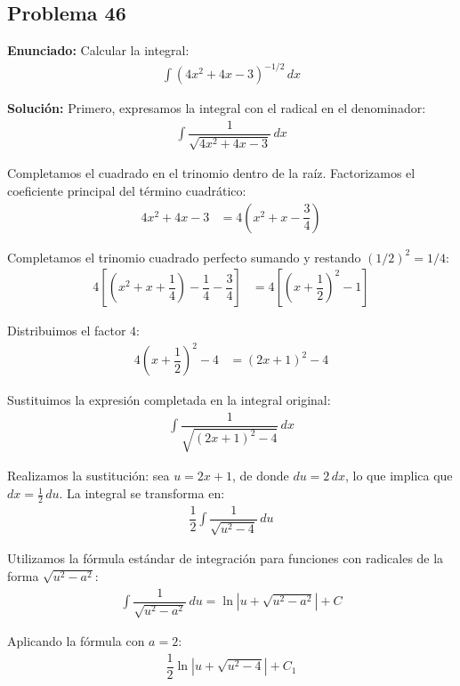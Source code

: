 \subsection*{Problema 46}
\textbf{Enunciado:} Calcular la integral:
\begin{align*}
\int (4x^2 + 4x - 3)^{-1/2} \, dx
\end{align*}

\textbf{Solución:}
Primero, expresamos la integral con el radical en el denominador:
\begin{align*}
\int \dfrac{1}{\sqrt{4x^2 + 4x - 3}} \, dx
\end{align*}

Completamos el cuadrado en el trinomio dentro de la raíz. Factorizamos el coeficiente principal del término cuadrático:
\begin{align*}
4x^2 + 4x - 3 &= 4\left(x^2 + x - \dfrac{3}{4}\right)
\end{align*}

Completamos el trinomio cuadrado perfecto sumando y restando $(1/2)^2 = 1/4$:
\begin{align*}
4\left[\left(x^2 + x + \dfrac{1}{4}\right) - \dfrac{1}{4} - \dfrac{3}{4}\right] &= 4\left[\left(x + \dfrac{1}{2}\right)^2 - 1\right]
\end{align*}

Distribuimos el factor $4$:
\begin{align*}
4\left(x + \dfrac{1}{2}\right)^2 - 4 &= (2x + 1)^2 - 4
\end{align*}

Sustituimos la expresión completada en la integral original:
\begin{align*}
\int \dfrac{1}{\sqrt{(2x + 1)^2 - 4}} \, dx
\end{align*}

Realizamos la sustitución: sea $u = 2x + 1$, de donde $du = 2 \, dx$, lo que implica que $dx = \frac{1}{2} \, du$. La integral se transforma en:
\begin{align*}
\dfrac{1}{2} \int \dfrac{1}{\sqrt{u^2 - 4}} \, du
\end{align*}

Utilizamos la fórmula estándar de integración para funciones con radicales de la forma $\sqrt{u^2 - a^2}$:
\begin{align*}
\int \dfrac{1}{\sqrt{u^2 - a^2}} \, du = \ln\left|u + \sqrt{u^2 - a^2}\right| + C
\end{align*}

Aplicando la fórmula con $a = 2$:
\begin{align*}
\dfrac{1}{2} \ln\left|u + \sqrt{u^2 - 4}\right| + C_1
\end{align*}

